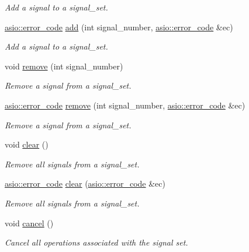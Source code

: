 \begin{DoxyCompactItemize}
\begin{DoxyCompactList}\small\item\em Add a signal to a signal\+\_\+set. \end{DoxyCompactList}\item 
\hyperlink{classasio_1_1error__code}{asio\+::error\+\_\+code} \hyperlink{classasio_1_1basic__signal__set_a5dd45f1913a58bbd887b01e140685182}{add} (int signal\+\_\+number, \hyperlink{classasio_1_1error__code}{asio\+::error\+\_\+code} \&ec)
\begin{DoxyCompactList}\small\item\em Add a signal to a signal\+\_\+set. \end{DoxyCompactList}\item 
void \hyperlink{classasio_1_1basic__signal__set_a7723194cf21d09960262cd5ca749124a}{remove} (int signal\+\_\+number)
\begin{DoxyCompactList}\small\item\em Remove a signal from a signal\+\_\+set. \end{DoxyCompactList}\item 
\hyperlink{classasio_1_1error__code}{asio\+::error\+\_\+code} \hyperlink{classasio_1_1basic__signal__set_a80f41750e7d2f580b0a4f00f7f190ca1}{remove} (int signal\+\_\+number, \hyperlink{classasio_1_1error__code}{asio\+::error\+\_\+code} \&ec)
\begin{DoxyCompactList}\small\item\em Remove a signal from a signal\+\_\+set. \end{DoxyCompactList}\item 
void \hyperlink{classasio_1_1basic__signal__set_a0980074b6d53c1ced39942316086c085}{clear} ()
\begin{DoxyCompactList}\small\item\em Remove all signals from a signal\+\_\+set. \end{DoxyCompactList}\item 
\hyperlink{classasio_1_1error__code}{asio\+::error\+\_\+code} \hyperlink{classasio_1_1basic__signal__set_ab5f999fb00ea5d0701653bb4c2592e64}{clear} (\hyperlink{classasio_1_1error__code}{asio\+::error\+\_\+code} \&ec)
\begin{DoxyCompactList}\small\item\em Remove all signals from a signal\+\_\+set. \end{DoxyCompactList}\item 
void \hyperlink{classasio_1_1basic__signal__set_a634ed8b0d0d6e217cc7da59e52719486}{cancel} ()
\begin{DoxyCompactList}\small\item\em Cancel all operations associated with the signal set. \end{DoxyCompactList}\item 

\end{DoxyCompactItemize}
